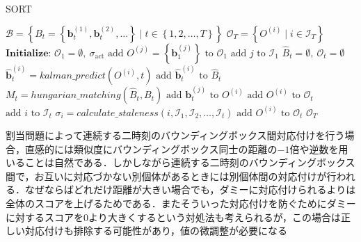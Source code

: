     \begin{algorithm}[t]
        \caption[SORT]{SORT}
        \label{alg:sort}
        \begin{algorithmic}[1]
            \Require $\mathcal{B} = \left\{B_t = \left\{\bm{b}_t^{(1)}, \bm{b}_t^{(2)}, \dots\right\} \mid t \in \left\{1, 2, \dots, T\right\}\right\}$
            \Ensure $\mathcal{O}_T = \left\{O^{(i)} \mid i \in \mathcal{I}_T\right\}$
            \State $\textbf{Initialize: } \mathcal{O}_{1} = \emptyset,\ \sigma_{\text{act}}$
                \State $\text{add } O^{(j)} = \left\{\bm{b}_1^{(j)}\right\} \text{ to } \mathcal{O}_{1}$
                \State $\text{add } j \text{ to }\mathcal{I}_1 $
            \EndFor
                \State $\hat{B}_t = \emptyset,\ \mathcal{O}_t = \emptyset$
                    \State $\hat{\bm{b}}_t^{(i)} = kalman\_predict(O^{(i)}, t)$
                    \State $\text{add } \hat{\bm{b}}_t^{(i)} \text{ to }\hat{B}_t $
                \EndFor
                \State $M_t = hungarian\_matching(\hat{B}_t, B_t)$
                    \State $\text{add } \bm{b}_t^{(j)} \text{ to } O^{(i)}$
                    \State $\text{add } O^{(i)} \text{ to } \mathcal{O}_t$
                    \State $\text{add } i \text{ to } \mathcal{I}_t$
                \EndFor
                    \State $\sigma_i = calculate\_staleness(i, \mathcal{I}_1, \mathcal{I}_2, \dots, \mathcal{I}_t)$
                        \State $\text{add } O^{(i)} \text{ to } \mathcal{O}_t$
                    \EndIf
                \EndFor
            \EndFor
            \State \Return $\mathcal{O}_{T}$
        \end{algorithmic}
    \end{algorithm}

    割当問題によって連続する二時刻のバウンディングボックス間対応付けを行う場合，直感的には類似度にバウンディングボックス同士の距離の$-1$倍や逆数を用いることは自然である．しかしながら連続する二時刻のバウンディングボックス間で，お互いに対応づかない別個体があるときには別個体間の対応付けが行われる．なぜならばどれだけ距離が大きい場合でも，ダミーに対応付けられるよりは全体のスコアを上げるためである．またそういった対応付けを防ぐためにダミーに対するスコアを$0$より大きくするという対処法も考えられるが，この場合は正しい対応付けも排除する可能性があり，値の微調整が必要になる

